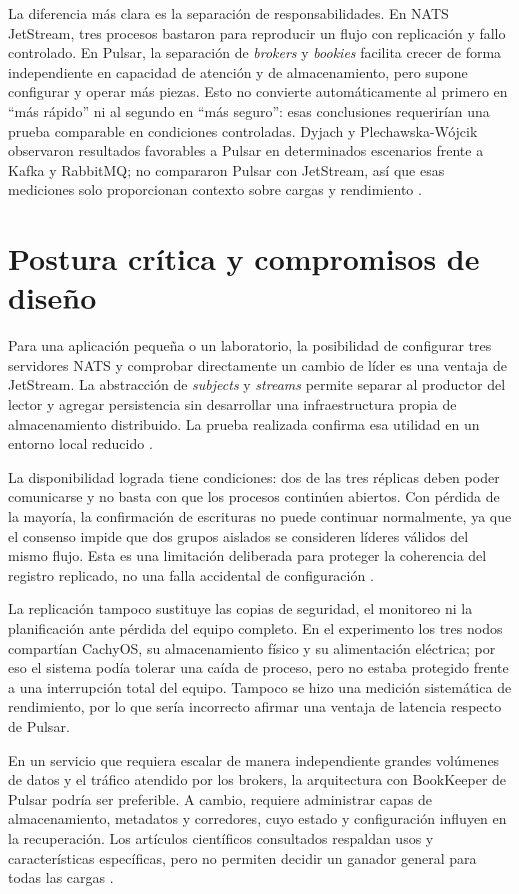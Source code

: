 \documentclass[12pt,a4paper]{article}
\begin{document}
La diferencia más clara es la separación de responsabilidades. En NATS JetStream, tres procesos bastaron para reproducir un flujo con replicación y fallo controlado. En Pulsar, la separación de \emph{brokers} y \emph{bookies} facilita crecer de forma independiente en capacidad de atención y de almacenamiento, pero supone configurar y operar más piezas. Esto no convierte automáticamente al primero en ``más rápido'' ni al segundo en ``más seguro'': esas conclusiones requerirían una prueba comparable en condiciones controladas. Dyjach y Plechawska-Wójcik observaron resultados favorables a Pulsar en determinados escenarios frente a Kafka y RabbitMQ; no compararon Pulsar con JetStream, así que esas mediciones solo proporcionan contexto sobre cargas y rendimiento \cite{dyjach2024}.

\section{Postura crítica y compromisos de diseño}
Para una aplicación pequeña o un laboratorio, la posibilidad de configurar tres servidores NATS y comprobar directamente un cambio de líder es una ventaja de JetStream. La abstracción de \emph{subjects} y \emph{streams} permite separar al productor del lector y agregar persistencia sin desarrollar una infraestructura propia de almacenamiento distribuido. La prueba realizada confirma esa utilidad en un entorno local reducido \cite{natsjetstream}.

La disponibilidad lograda tiene condiciones: dos de las tres réplicas deben poder comunicarse y no basta con que los procesos continúen abiertos. Con pérdida de la mayoría, la confirmación de escrituras no puede continuar normalmente, ya que el consenso impide que dos grupos aislados se consideren líderes válidos del mismo flujo. Esta es una limitación deliberada para proteger la coherencia del registro replicado, no una falla accidental de configuración \cite{natsreplication}.

La replicación tampoco sustituye las copias de seguridad, el monitoreo ni la planificación ante pérdida del equipo completo. En el experimento los tres nodos compartían CachyOS, su almacenamiento físico y su alimentación eléctrica; por eso el sistema podía tolerar una caída de proceso, pero no estaba protegido frente a una interrupción total del equipo. Tampoco se hizo una medición sistemática de rendimiento, por lo que sería incorrecto afirmar una ventaja de latencia respecto de Pulsar.

En un servicio que requiera escalar de manera independiente grandes volúmenes de datos y el tráfico atendido por los brokers, la arquitectura con BookKeeper de Pulsar podría ser preferible. A cambio, requiere administrar capas de almacenamiento, metadatos y corredores, cuyo estado y configuración influyen en la recuperación. Los artículos científicos consultados respaldan usos y características específicas, pero no permiten decidir un ganador general para todas las cargas \cite{pulsararchitecture,do2025,dyjach2024}.
\end{document}
